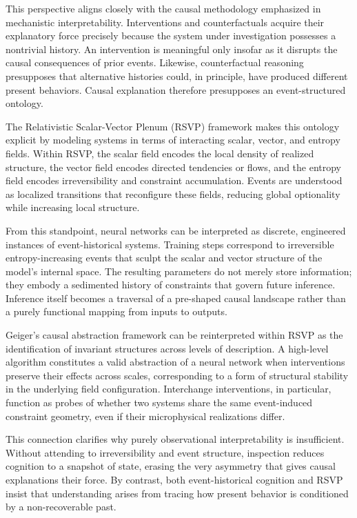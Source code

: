 \documentclass[11pt]{article}
\begin{document}
This perspective aligns closely with the causal methodology emphasized in
mechanistic interpretability. Interventions and counterfactuals acquire their
explanatory force precisely because the system under investigation possesses a
nontrivial history. An intervention is meaningful only insofar as it disrupts
the causal consequences of prior events. Likewise, counterfactual reasoning
presupposes that alternative histories could, in principle, have produced
different present behaviors. Causal explanation therefore presupposes an
event-structured ontology.

The Relativistic Scalar-Vector Plenum (RSVP) framework makes this ontology
explicit by modeling systems in terms of interacting scalar, vector, and
entropy fields. Within RSVP, the scalar field encodes the local density of
realized structure, the vector field encodes directed tendencies or flows, and
the entropy field encodes irreversibility and constraint accumulation. Events
are understood as localized transitions that reconfigure these fields, reducing
global optionality while increasing local structure.

From this standpoint, neural networks can be interpreted as discrete,
engineered instances of event-historical systems. Training steps correspond to
irreversible entropy-increasing events that sculpt the scalar and vector
structure of the model’s internal space. The resulting parameters do not merely
store information; they embody a sedimented history of constraints that govern
future inference. Inference itself becomes a traversal of a pre-shaped causal
landscape rather than a purely functional mapping from inputs to outputs.

Geiger’s causal abstraction framework can be reinterpreted within RSVP as the
identification of invariant structures across levels of description. A
high-level algorithm constitutes a valid abstraction of a neural network when
interventions preserve their effects across scales, corresponding to a form of
structural stability in the underlying field configuration. Interchange
interventions, in particular, function as probes of whether two systems share
the same event-induced constraint geometry, even if their microphysical
realizations differ.

This connection clarifies why purely observational interpretability is
insufficient. Without attending to irreversibility and event structure,
inspection reduces cognition to a snapshot of state, erasing the very asymmetry
that gives causal explanations their force. By contrast, both event-historical
cognition and RSVP insist that understanding arises from tracing how present
behavior is conditioned by a non-recoverable past.
\end{document}
